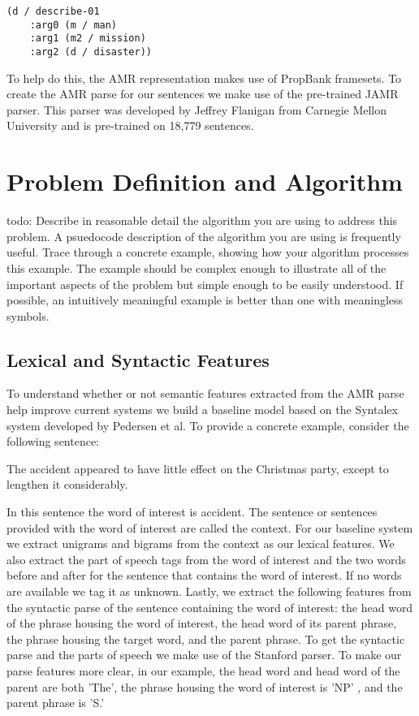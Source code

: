 \documentclass[12pt]{article}
\begin{document}
\begin{verbatim}
(d / describe-01
    :arg0 (m / man)
    :arg1 (m2 / mission)
    :arg2 (d / disaster))
\end{verbatim}

To help do this, the AMR representation makes use of PropBank framesets. To create the AMR parse for our sentences we make use of the pre-trained JAMR parser\cite{jamr}. This parser was developed by Jeffrey Flanigan from Carnegie Mellon University and is pre-trained on 18,779 sentences.

\section{Problem Definition and Algorithm}

todo: Describe in reasonable detail the algorithm you are using to address this problem. A psuedocode description of the algorithm you are using is frequently useful. Trace through a concrete example, showing how your algorithm processes this example. The example should be complex enough to illustrate all of the important aspects of the problem but simple enough to be easily understood. If possible, an intuitively meaningful example is better than one with meaningless symbols. 

\subsection{Lexical and Syntactic Features}

To understand whether or not semantic features extracted from the AMR parse help improve current systems we build a baseline model based on the Syntalex system developed by Pedersen et al\cite{syntalex}. To provide a concrete example, consider the following sentence:

\vspace{4mm}
The accident appeared to have little effect on the Christmas party, except to lengthen it considerably.
\vspace{4mm}

\noindent
In this sentence the word of interest is accident. The sentence or sentences provided with the word of interest are called the context. For our baseline system we extract unigrams and bigrams from the context as our lexical features. We also extract the part of speech tags from the word of interest and the two words before and after for the sentence that contains the word of interest. If no words are available we tag it as unknown. Lastly, we extract the following features from the syntactic parse of the sentence containing the word of interest: the head word of the phrase housing the word of interest, the head word of its parent phrase, the phrase housing the target word, and the parent phrase. To get the syntactic parse and the parts of speech we make use of the Stanford parser\cite{sp}. To make our parse features more clear, in our example, the head word and head word of the parent are both 'The', the phrase housing the word of interest is 'NP' , and the parent phrase is 'S.'
\end{document}
